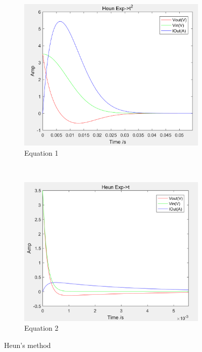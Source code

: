\documentclass[a4paper, 12pt]{article}
\begin{document}
\begin{figure}[h]
      \centering
      \begin{subfigure}[b]{0.4\textwidth}
            \includegraphics[width=\textwidth]{ex1/heun_exp_t_sqr.PNG}
            \caption{Equation 1}
      \end{subfigure}
      ~
      \begin{subfigure}[b]{0.4\textwidth}
            \includegraphics[width=\textwidth]{ex1/heun_exp_t.PNG}
            \caption{Equation 2}
      \end{subfigure}
      \caption{Heun's method}
\end{figure}
\end{document}

